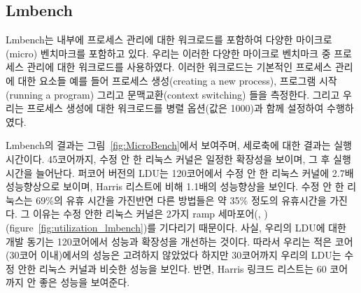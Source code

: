 \subsection{Lmbench}
Lmbench는 내부에 프로세스 관리에 대한 워크로드를 포함하여
 다양한 마이크로(micro) 벤치마크를 포함하고 있다. 
우리는 이러한 다양한 마이크로 벤치마크 중 프로세스 관리에 대한 워크로드를 사용하였다. 
이러한 워크로드는 기본적인 프로세스 관리에 대한 요소들 예를 들어 프로세스 생성(creating a new process),
 프로그램 시작(running a program) 그리고 문맥교환(context switching) 들을 측정한다.
그리고 우리는 프로세스 생성에 대한 워크로드를 병렬 옵션(값은 1000)과 함께 설정하여 수행하였다. 

Lmbench의 결과는 그림~\ref{fig:MicroBench}에서 보여주며, 세로축에 대한 결과는 실행 시간이다.
45코어까지, 수정 안 한 리눅스 커널은 일정한 확장성을 보이며, 그 후 실행시간을 늘어난다.
퍼코어 버전의 LDU는 120코어에서 수정 안 한 리눅스 커널에 2.7배 성능향상으로
 보이며, Harris 리스트에 비해 1.1배의 성능향상을 보인다.
수정 안 한 리눅스는 69\%의 유휴 시간을 가진반면 다른 방법들은 약 35\% 정도의 유휴시간을 가진다.
그 이유는 수정 안한 리눅스 커널은 2가지 ramp 세마포어(,
)(figure~\ref{fig:utilization_lmbench})를 기다리기 때문이다. 
사실, 우리의 LDU에 대한 개발 동기는 120코어에서 성능과 확장성을 개선하는 것이다. 
따라서 우리는 적은 코어(30코어 이내)에서의 성능은 고려하지 않았었다
하지만 30코어까지 우리의 LDU는 수정 안한 리눅스 커널과 비슷한 성능을 보인다. 
반면, Harris 링크드 리스트는 60 코어 까지 안 좋은 성능을 보여준다. 

